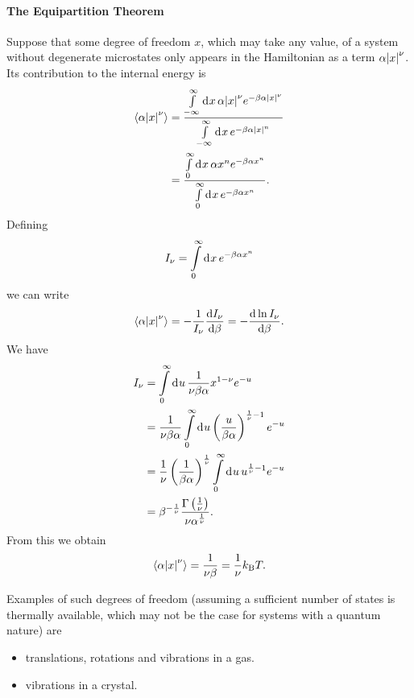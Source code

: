 \paragraph{The Equipartition Theorem}
Suppose that some degree of freedom $x$, which may take any value, of a system without degenerate microstates only appears in the Hamiltonian as a term $\alpha\abs{x}^{\nu}$. Its contribution to the internal energy is
\begin{align*}
	\expval{\alpha\abs{x}^{\nu}} &= \frac{\int\limits_{-\infty}^{\infty}\dd[]{x}\alpha\abs{x}^{\nu}e^{-\beta\alpha\abs{x}^{\nu}}}{\int\limits_{-\infty}^{\infty}\dd[]{x}e^{-\beta\alpha\abs{x}^{n}}} \\
	                             &= \frac{\int\limits_{0}^{\infty}\dd[]{x}\alpha x^{n}e^{-\beta\alpha x^{n}}}{\int\limits_{0}^{\infty}\dd[]{x}e^{-\beta\alpha x^{n}}}.
\end{align*}
Defining
\begin{align*}
	I_{\nu} = \int\limits_{0}^{\infty}\dd[]{x}e^{-\beta\alpha x^{n}}
\end{align*}
we can write
\begin{align*}
	\expval{\alpha\abs{x}^{\nu}} = -\frac{1}{I_{\nu}}\dv{I_{\nu}}{\beta} = -\dv{\ln{I_{\nu}}}{\beta}.
\end{align*}
We have
\begin{align*}
	I_{\nu} &= \int\limits_{0}^{\infty}\dd[]{u}\frac{1}{\nu\beta\alpha}x^{1 - \nu}e^{-u} \\
	        &= \frac{1}{\nu\beta\alpha}\int\limits_{0}^{\infty}\dd[]{u}\left(\frac{u}{\beta\alpha}\right)^{\frac{1}{\nu} - 1}e^{-u} \\
	        &= \frac{1}{\nu}\left(\frac{1}{\beta\alpha}\right)^{\frac{1}{\nu}}\int\limits_{0}^{\infty}\dd[]{u}u^{\frac{1}{\nu} - 1}e^{-u} \\
	        &= \beta^{-\frac{1}{\nu}}\frac{\Gamma\left(\frac{1}{\nu}\right)}{\nu\alpha^{\frac{1}{\nu}}}.
\end{align*}
From this we obtain
\begin{align*}
	\expval{\alpha\abs{x}^{\nu}} = \frac{1}{\nu\beta} = \frac{1}{\nu}k_{\text{B}} T.
\end{align*}

Examples of such degrees of freedom (assuming a sufficient number of states is thermally available, which may not be the case for systems with a quantum nature) are
\begin{itemize}
	\item translations, rotations and vibrations in a gas.
	\item vibrations in a crystal.
\end{itemize}


